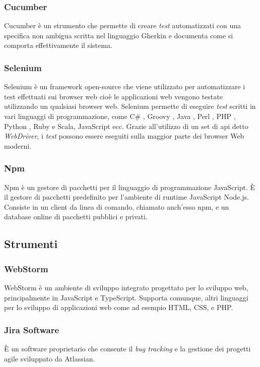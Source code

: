 {\subsubsection*{Cucumber}
Cucumber è un strumento che permette di creare \emph{test} automatizzati con una specifica non ambigua scritta nel linguaggio Gherkin e documenta come si comporta effettivamente il sistema.

\subsubsection*{Selenium}
Selenium è un \gls{framework}\ap{[g]} \gls{open-source}\ap{[g]} che viene utilizzato per automatizzare i test effettuati sui browser web cioè le applicazioni web vengono testate utilizzando un qualsiasi browser web. Selenium permette di eseguire \emph{test} scritti in vari linguaggi di programmazione, come C\# , Groovy , Java , Perl , \gls{PHP} , Python , Ruby e Scala, JavaScript ecc. Grazie all'utilizzo di un set di \gls{api}\ap{[g]} detto \emph{WebDriver}, i \emph{test} possono essere eseguiti sulla maggior parte dei browser Web moderni.

\subsubsection*{Npm}
Npm è un gestore di pacchetti per il linguaggio di programmazione JavaScript. È il gestore di pacchetti predefinito per l'ambiente di runtime JavaScript Node.js. Consiste in un client da linea di comando, chiamato anch'esso npm, e un database online di pacchetti pubblici e privati.

\subsection{Strumenti}

\subsubsection*{WebStorm}
WebStorm è un ambiente di sviluppo integrato progettato per lo sviluppo web, principalmente in JavaScript e TypeScript. Supporta comunque, altri linguaggi per lo sviluppo di applicazioni web come ad esempio \gls{HTML}, \gls{CSS}, e \gls{PHP}.

\subsubsection{Jira Software}
È un software proprietario che consente il \emph{bug tracking} e la gestione dei progetti agile sviluppato da Atlassian.

}
